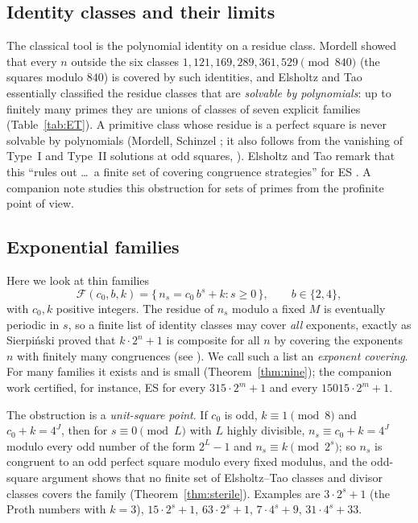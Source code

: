 \documentclass[11pt,reqno]{amsart}
\theoremstyle{definition}
\begin{document}
\subsection*{Identity classes and their limits}
The classical tool is the polynomial identity on a residue class.  Mordell
\cite{Mordell} showed that every $n$ outside the six classes
$1,121,169,289,361,529\pmod{840}$ (the squares modulo $840$) is covered by
such identities, and Elsholtz and Tao \cite[Prop.~1.9]{ET} essentially
classified the residue classes that are \emph{solvable by polynomials}: up
to finitely many primes they are unions of classes of seven explicit
families (Table~\ref{tab:ET}).  A primitive class whose residue is a perfect
square is never solvable by polynomials (Mordell, Schinzel
\cite{Mordell,Schinzel}; it also follows from the vanishing of Type~I and
Type~II solutions at odd squares, \cite[Prop.~1.6]{ET}).  Elsholtz and Tao
remark that this ``rules out \dots\ a finite set of covering congruence
strategies'' for ES \cite[p.~6]{ET}.  A companion note \cite{CovNote}
studies this obstruction for sets of primes from the profinite point of
view.

\subsection*{Exponential families}
Here we look at thin families
\[
  \mathcal F(c_0,b,k)=\{\,n_s=c_0\,b^s+k : s\ge0\,\},\qquad b\in\{2,4\},
\]
with $c_0,k$ positive integers.  The residue of $n_s$ modulo a fixed $M$ is
eventually periodic in $s$, so a finite list of identity classes may cover
\emph{all} exponents, exactly as Sierpi\'nski \cite{Sierpinski} proved that
$k\cdot2^n+1$ is composite for all $n$ by covering the exponents $n$ with
finitely many congruences (see \cite[\S1]{FFK}).  We call such a list an
\emph{exponent covering}.  For many families it exists and is small
(Theorem~\ref{thm:nine}); the companion work \cite{ExpCov} certified,
for instance, ES for every $315\cdot2^m+1$ and every $15015\cdot2^m+1$.

The obstruction is a \emph{unit-square point}.  If $c_0$ is odd,
$k\equiv1\pmod8$ and $c_0+k=4^J$, then for $s\equiv0\pmod L$ with $L$
highly divisible, $n_s\equiv c_0+k=4^J$ modulo every odd number of the form
$2^L-1$ and $n_s\equiv k\pmod{2^s}$; so $n_s$ is congruent to an odd
perfect square modulo every fixed modulus, and the odd-square argument
shows that no finite set of Elsholtz--Tao classes and divisor classes
covers the family (Theorem~\ref{thm:sterile}).  Examples are
$3\cdot2^s+1$ (the Proth numbers with $k=3$), $15\cdot2^s+1$,
$63\cdot2^s+1$, $7\cdot4^s+9$, $31\cdot4^s+33$.
\end{document}
